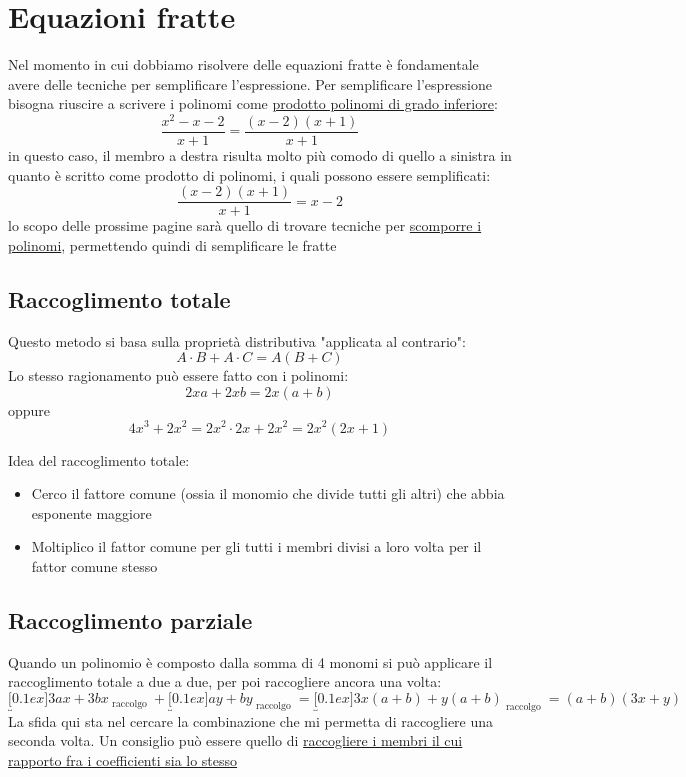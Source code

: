 \section{Equazioni fratte}
Nel momento in cui dobbiamo risolvere delle equazioni fratte è fondamentale avere delle tecniche per semplificare l'espressione. Per semplificare l'espressione bisogna riuscire a scrivere i polinomi come \underline{prodotto polinomi di grado inferiore}:
\[
	\frac{x^2 -x - 2}{x+1} = \frac{\left(x-2\right)\left(x+1\right)}{x+1}
\]
in questo caso, il membro a destra risulta molto più comodo di quello a sinistra in quanto è scritto come prodotto di polinomi, i quali possono essere semplificati:
\[
	\frac{\left(x-2\right)\left(x+1\right)}{x+1} = x-2
\]
lo scopo delle prossime pagine sarà quello di trovare tecniche per \underline{scomporre i polinomi}, permettendo quindi di semplificare le fratte
\subsection{Raccoglimento totale}
Questo metodo si basa sulla proprietà distributiva "applicata al contrario":
\[
	A \cdot B + A \cdot C = A\left(B + C\right)
\]
Lo stesso ragionamento può essere fatto con i polinomi:
\[
	2x a + 2x b = 2x \left(a + b\right)
\]
oppure
\[
	4x^3  + 2x^2  = 2x^2  \cdot 2x + 2x^2  = 2x^2  \left(2x +1\right)
\]
\begin{tcolorbox}
	Idea del raccoglimento totale:
	\begin{itemize}
		\item Cerco il fattore comune (ossia il monomio che divide tutti gli altri) che abbia esponente maggiore
		\item Moltiplico il fattor comune per gli tutti i membri divisi a loro volta per il fattor comune stesso
	\end{itemize}
\end{tcolorbox}

\subsection{Raccoglimento parziale}
Quando un polinomio è composto dalla somma di 4 monomi si può applicare il raccoglimento totale a due a due, per poi raccogliere ancora una volta:
\[
	\underbracket[0.1ex]{3ax + 3bx}_{\text{ raccolgo }} + \underbracket[0.1ex]{ay + by}_{\text{ raccolgo }} = \underbracket[0.1ex]{3x\left(a + b\right) + y\left(a + b\right)}_{\text{ raccolgo }} = \left(a+b\right)\left(3x + y\right)
\]
La sfida qui sta nel cercare la combinazione che mi permetta di raccogliere una seconda volta. Un consiglio può essere quello di \underline{raccogliere i membri il cui rapporto fra i coefficienti sia lo stesso}

